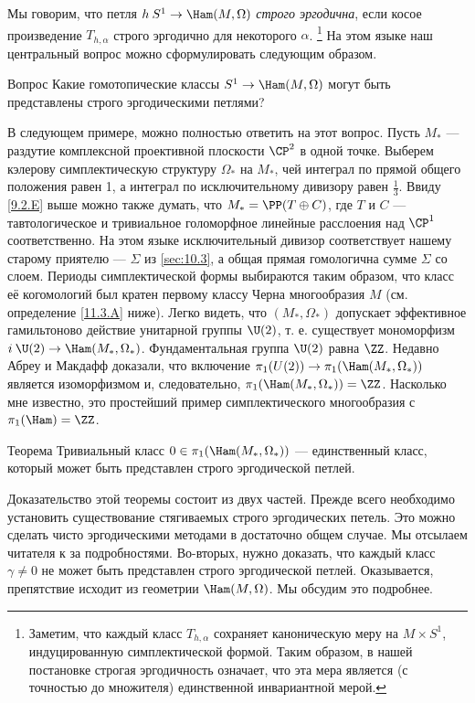 Мы говорим, что петля $h\: S^1 \to \Ham(M, \Omega)$ \emph{строго эргодична}, если косое произведение $T_{h,\alpha}$ строго эргодично для некоторого $\alpha$.%
\footnote{Заметим, что каждый класс $T_{h,\alpha}$ сохраняет каноническую меру на $M \times S^1$, индуцированную симплектической формой.
Таким образом, в нашей постановке строгая эргодичность означает, что эта мера является (с точностью до множителя) единственной инвариантной мерой.}
На этом языке наш центральный вопрос можно сформулировать следующим образом.

\begin{ex*}{Вопрос}
Какие гомотопические классы $S^1 \to \Ham(M, \Omega)$ могут быть представлены строго эргодическими петлями?
\end{ex*}

В следующем примере, можно полностью ответить на этот вопрос.
Пусть $M_\ast$ --- раздутие комплексной проективной плоскости $\CP^2$ в одной точке.
Выберем кэлерову симплектическую структуру $\Omega_\ast$ на $M_\ast$, чей интеграл по прямой общего положения равен 1, а интеграл по исключительному дивизору равен $\tfrac13$.
Ввиду \ref{9.2.E} выше можно также думать, что $M_\ast = \PP(T \oplus C)$, где $T$ и $C$ --- тавтологическое и тривиальное голоморфное линейные расслоения над $\CP^1$ соответственно.
На этом языке исключительный дивизор соответствует нашему старому приятелю --- $\Sigma$ из \ref{sec:10.3}, а общая прямая гомологична сумме $\Sigma$ со слоем.
Периоды симплектической формы выбираются таким образом, что класс её когомологий был кратен первому классу Черна многообразия $M$ (см. определение \ref{11.3.A} ниже).
Легко видеть, что $(M_\ast, \Omega_\ast)$ допускает эффективное гамильтоново действие унитарной группы $\U(2)$, т. е. существует мономорфизм $i\: \U(2) \to \Ham(M_\ast, \Omega_\ast)$.
Фундаментальная группа $\U(2)$ равна $\ZZ$.
Недавно Абреу и Макдафф \cite{AM} доказали, что включение $\pi_1(U(2)) \to \pi_1 (\Ham(M_\ast, \Omega_\ast))$ является изоморфизмом и, следовательно, $\pi_1(\Ham(M_\ast, \Omega_\ast)) = \ZZ$.
Насколько мне известно, это простейший пример симплектического многообразия с $\pi_1 (\Ham) = \ZZ$.

\begin{thm}{Теорема}\label{11.1.A}
Тривиальный класс $0\in\pi_1(\Ham(M_\ast, \Omega_\ast))$ --- единственный класс, который может быть представлен строго эргодической петлей.
\end{thm}

Доказательство этой теоремы состоит из двух частей.
Прежде всего необходимо установить существование стягиваемых строго эргодических петель.
Это можно сделать чисто эргодическими методами в достаточно общем случае.
Мы отсылаем читателя к \cite{P9} за подробностями.
Во-вторых, нужно доказать, что каждый класс $\gamma \ne 0$ не может быть представлен строго эргодической петлей.
Оказывается, препятствие исходит из геометрии $\Ham(M, \Omega)$.
Мы обсудим это подробнее.


